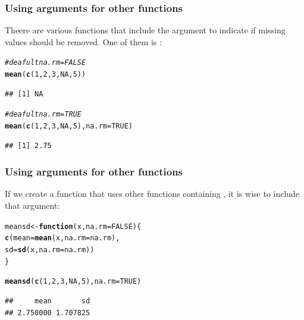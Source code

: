 \documentclass[12pt]{beamer}\usepackage[]{graphicx}\usepackage[]{color}
\makeatletter
\newcommand{\hlnum}[1]{\textcolor[rgb]{0.686,0.059,0.569}{#1}}%
\newcommand{\hlcom}[1]{\textcolor[rgb]{0.678,0.584,0.686}{\textit{#1}}}%
\newcommand{\hlstd}[1]{\textcolor[rgb]{0.345,0.345,0.345}{#1}}%
\newcommand{\hlkwa}[1]{\textcolor[rgb]{0.161,0.373,0.58}{\textbf{#1}}}%
\newcommand{\hlkwb}[1]{\textcolor[rgb]{0.69,0.353,0.396}{#1}}%
\newcommand{\hlkwc}[1]{\textcolor[rgb]{0.333,0.667,0.333}{#1}}%
\newcommand{\hlkwd}[1]{\textcolor[rgb]{0.737,0.353,0.396}{\textbf{#1}}}%
\newenvironment{kframe}{%
 \def\at@end@of@kframe{}%
 \ifinner\ifhmode%
  \def\at@end@of@kframe{\end{minipage}}%
  \begin{minipage}{\columnwidth}%
 \fi\fi%
 \def\FrameCommand##1{\hskip\@totalleftmargin \hskip-\fboxsep
 \colorbox{shadecolor}{##1}\hskip-\fboxsep
     \hskip-\linewidth \hskip-\@totalleftmargin \hskip\columnwidth}%
 \MakeFramed {\advance\hsize-\width
   \@totalleftmargin\z@ \linewidth\hsize
   \@setminipage}}%
 {\par\unskip\endMakeFramed%
 \at@end@of@kframe}
\newenvironment{knitrout}{}{} %
\makeatother
\begin{document}
\begin{frame}[fragile]
\frametitle{Using arguments for other functions}

Theere are various functions that include the argument {\hilit {}} to indicate if missing values should be removed. One of them is :
\begin{knitrout}\footnotesize
{}\color{fgcolor}\begin{kframe}
\begin{alltt}
\hlcom{# deafult na.rm = FALSE}
\hlkwd{mean}\hlstd{(}\hlkwd{c}\hlstd{(}\hlnum{1}\hlstd{,} \hlnum{2}\hlstd{,} \hlnum{3}\hlstd{,} \hlnum{NA}\hlstd{,} \hlnum{5}\hlstd{))}
\end{alltt}
\begin{verbatim}
## [1] NA
\end{verbatim}
\begin{alltt}
\hlcom{# deafult na.rm = TRUE}
\hlkwd{mean}\hlstd{(}\hlkwd{c}\hlstd{(}\hlnum{1}\hlstd{,} \hlnum{2}\hlstd{,} \hlnum{3}\hlstd{,} \hlnum{NA}\hlstd{,} \hlnum{5}\hlstd{),} \hlkwc{na.rm} \hlstd{=} \hlnum{TRUE}\hlstd{)}
\end{alltt}
\begin{verbatim}
## [1] 2.75
\end{verbatim}
\end{kframe}
\end{knitrout}

\end{frame}


\begin{frame}[fragile]
\frametitle{Using arguments for other functions}

If we create a function that uses other functions containing , it is wise to include that argument:
\begin{knitrout}\footnotesize
{}\color{fgcolor}\begin{kframe}
\begin{alltt}
\hlstd{meansd} \hlkwb{<-} \hlkwa{function}\hlstd{(}\hlkwc{x}\hlstd{,} \hlkwc{na.rm} \hlstd{=} \hlnum{FALSE}\hlstd{) \{}
  \hlkwd{c}\hlstd{(}\hlkwc{mean} \hlstd{=} \hlkwd{mean}\hlstd{(x,} \hlkwc{na.rm} \hlstd{= na.rm),}
    \hlkwc{sd} \hlstd{=} \hlkwd{sd}\hlstd{(x,} \hlkwc{na.rm} \hlstd{= na.rm))}
\hlstd{\}}

\hlkwd{meansd}\hlstd{(}\hlkwd{c}\hlstd{(}\hlnum{1}\hlstd{,} \hlnum{2}\hlstd{,} \hlnum{3}\hlstd{,} \hlnum{NA}\hlstd{,} \hlnum{5}\hlstd{),} \hlkwc{na.rm} \hlstd{=} \hlnum{TRUE}\hlstd{)}
\end{alltt}
\begin{verbatim}
##     mean       sd 
## 2.750000 1.707825
\end{verbatim}
\end{kframe}
\end{knitrout}

\end{frame}
\end{document}
